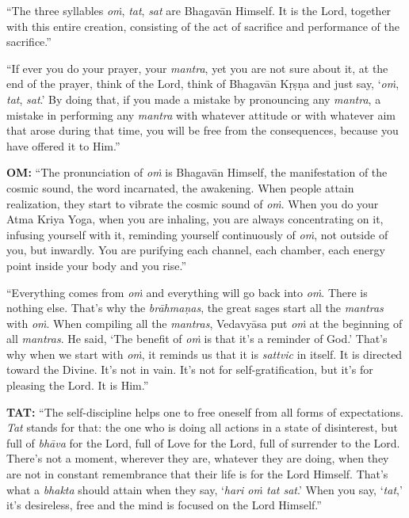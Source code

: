 \enquote{The three syllables \textit{oṁ}, \textit{tat}, \textit{sat} are Bhagavān Himself. It is the Lord, together with this entire creation, consisting of the act of sacrifice and performance of the sacrifice.}

\enquote{If ever you do your prayer, your \textit{mantra}, yet you are not sure about it, at the end of the prayer, think of the Lord, think of Bhagavān Kṛṣṇa and just say, \enquote{\textit{oṁ}, \textit{tat}, \textit{sat}.} By doing that, if you made a mistake by pronouncing any \textit{mantra}, a mistake in performing any \textit{mantra} with whatever attitude or with whatever aim that arose during that time, you will be free from the consequences, because you have offered it to Him.}


\textbf{OṀ:} \enquote{The pronunciation of \textit{oṁ} is Bhagavān Himself, the manifestation of the cosmic sound, the word incarnated, the awakening. When people attain realization, they start to vibrate the cosmic sound of \textit{oṁ}. When you do your Atma Kriya Yoga, when you are inhaling, you are always concentrating on it, infusing yourself with it, reminding yourself continuously of \textit{oṁ}, not outside of you, but inwardly. You are purifying each channel, each chamber, each energy point inside your body and you rise.}

\enquote{Everything comes from \textit{oṁ} and everything will go back into \textit{oṁ}. There is nothing else. That’s why the \textit{brāhmaṇas}, the great sages start all the \textit{mantras} with \textit{oṁ}. When compiling all the \textit{mantras}, Vedavyāsa put \textit{oṁ} at the beginning of all \textit{mantras}. He said, \enquote{The benefit of \textit{oṁ} is that it’s a reminder of God.} That’s why when we start with \textit{oṁ}, it reminds us that it is \textit{sattvic} in itself. It is directed toward the Divine. It’s not in vain. It’s not for self-gratification, but it’s for pleasing the Lord. It is Him.}

\textbf{TAT:} \enquote{The self-discipline helps one to free oneself from all forms of expectations. \textit{Tat} stands for that: the one who is doing all actions in a state of disinterest, but full of \textit{bhāva} for the Lord, full of Love for the Lord, full of surrender to the Lord. There’s not a moment, wherever they are, whatever they are doing, when they are not in constant remembrance that their life is for the Lord Himself. That’s what a \textit{bhakta} should attain when they say, \enquote{\textit{hari oṁ tat sat}.} When you say, \enquote{\textit{tat},} it’s desireless, free and the mind is focused on the Lord Himself.}

